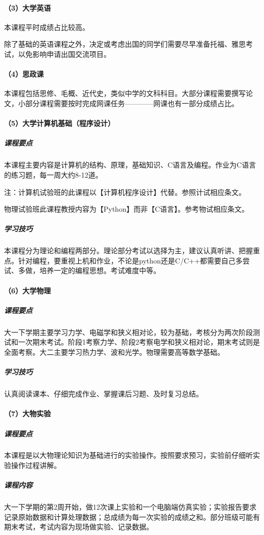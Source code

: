 \documentclass[
decoration,  %
]{qyxf-book}
\begin{document}
\paragraph{（3）大学英语}
本课程平时成绩占比较高。

除了基础的英语课程之外，决定或考虑出国的同学们需要尽早准备托福、雅思考试，以免影响申请出国交流项目。

\paragraph{（4）思政课}
本课程包括思修、毛概、近代史，类似中学的文科科目。大部分课程需要撰写论文，小部分课程需要按时完成网课任务————网课也有一部分成绩占比。

\paragraph{（5）大学计算机基础（程序设计）}
\subparagraph{课程要点}
本课程主要内容是计算机的结构、原理，基础知识、C语言及编程。作业为C语言的练习题，每一周大约8-12道。

注：计算机试验班的此课程以【计算机程序设计】代替。参照计试相应条文。

物理试验班此课程教授内容为【Python】而非【C语言】。参考物试相应条文。

\subparagraph{学习技巧}
本课程分为理论和编程两部分。理论部分考试以选择为主，建议认真听讲、把握重点。针对编程，要重视上机和作业，不论是python还是C/C++都需要自己多尝试、多做，培养一定的编程思想。考试难度中等。

\paragraph{（6）大学物理}
\subparagraph{课程要点}
大一下学期主要学习力学、电磁学和狭义相对论，较为基础，考核分为两次阶段测试和一次期末考试。阶段1考察力学、阶段2考察电学和狭义相对论，期末考试则是全面考察。大二主要学习热力学、波和光学。物理需要高等数学基础。

\subparagraph{学习技巧}
认真阅读课本、仔细完成作业、掌握课后习题、及时复习总结。

\paragraph{（7）大物实验}
\subparagraph{课程要点}
本课程是以大物理论知识为基础进行的实验操作。按照要求预习，实验前仔细听实验操作过程讲解。

\subparagraph{课程内容}
大一下学期的第2周开始，做12次课上实验和一个电脑端仿真实验；实验报告要求记录原始数据和计算处理数据；总成绩为每一次实验的成绩之和。部分班级可能有期末考试，考试内容为现场做实验、记录数据。
\end{document}
